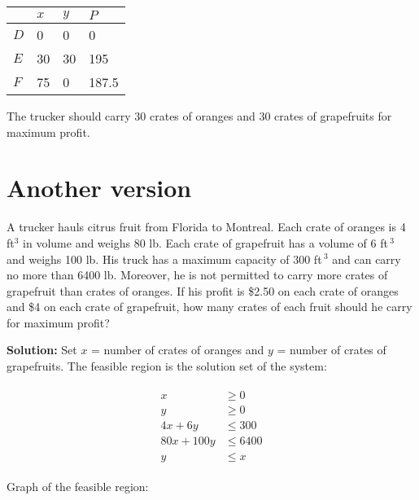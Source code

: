 \documentclass[paper=a4, fontsize=11pt]{scrartcl} %
\numberwithin{equation}{section} %
\numberwithin{figure}{section} %
\numberwithin{table}{section} %
\begin{document}
\begin{minipage}{.4\textwidth}
\begin{tabular}{|l|l|l|l|}
\hline
    & $x$ & $y$ & $P$ \\ \hline
$D$ &   0  &   0  &  0   \\ \hline
$E$ &   30  &  30   &  195   \\ \hline
$F$ &   75  &   0  &  187.5   \\ \hline
\end{tabular}
\end{minipage}
\begin{minipage}{.6\textwidth}
The trucker should carry 30 crates of oranges and 30 crates of grapefruits for maximum profit.
\end{minipage}
\section{Another version}
A trucker hauls citrus fruit from Florida to Montreal. Each crate of oranges is 4 ft${}^3$ in volume and weighs 80 lb. Each crate of grapefruit has a volume of 6 ft$\,^3$ and weighs 100 lb. His truck has a maximum capacity of 300 ft$\,^3$ and can carry no more than 6400 lb. Moreover, he is not permitted to carry more crates of grapefruit than crates of oranges. If his profit is \$2.50 on each crate of oranges and \$4 on each crate of grapefruit, how many crates of each fruit should he carry for maximum profit?

 {\bf{Solution:}} Set $x$ = number of crates of oranges and $y$ = number of crates of grapefruits. 
The feasible region is the solution set of the system:

\begin{align*} 
\begin{split}
x 	&\geq  0\\
y   &\geq 0\\
4x+6y &\leq 300\\
80x+100y &\leq 6400\\
y&\leq x
\end{split}					
\end{align*}

Graph of the feasible region:
\end{document}
